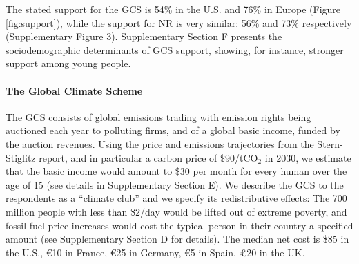 \documentclass{nature}
\begin{document}
The stated support for the GCS is 54\% in the U.S. and 76\% in Europe (Figure \ref{fig:support}), %
while the support for NR is very similar: 56\% and 73\% respectively (Supplementary Figure 3). Supplementary Section F presents the sociodemographic determinants of GCS support, showing, for instance, stronger support among young people.

\begin{tcolorbox}\label{box:GCS}
  \paragraph{The Global Climate Scheme} The GCS consists of global emissions trading with emission rights being auctioned each year to polluting firms, and of a global basic income, funded by the auction revenues. Using the price and emissions trajectories from the Stern-Stiglitz report,\cite{stern_report_2017} and in particular a carbon price of \$90/tCO$_\text{2}$ in 2030, we estimate that the basic income would amount to \$30 per month for every human over the age of 15 (see details in Supplementary Section E). %
  We describe the GCS to the respondents as a ``climate club'' and we specify its redistributive effects: The 700 million people with less than \$2/day would be lifted out of extreme poverty, and fossil fuel price increases would cost the typical person in their country a specified amount (see Supplementary Section D for details). The median net cost is \$85 in the U.S., \euro{}10 in France, \euro{}25 in Germany, \euro{}5 in Spain, £20 in the UK.
\end{tcolorbox}
\end{document}
